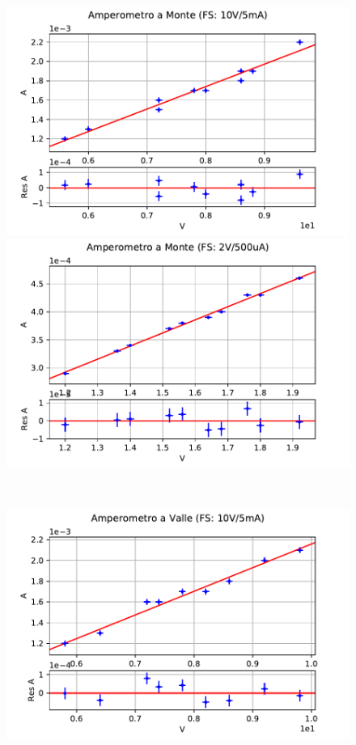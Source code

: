 \documentclass{article}
\begin{document}
\begin{figure}[t]
    \centering
    \begin{minipage}{0.5\textwidth}
        \centering
        \includegraphics[width=\textwidth]{data/AmpMon10V5mA.pdf} 
    \end{minipage}\hfill
    \begin{minipage}{0.5\textwidth}
        \centering
        \includegraphics[width=\textwidth]{data/AmpMon2V500uA.pdf} 
    \end{minipage}
    \\
    \centering
    \begin{minipage}{0.5\textwidth}
        \centering
        \includegraphics[width=\textwidth]{data/AmpVal10V5mA.pdf} 

\end{minipage}
\end{figure}
\end{document}
